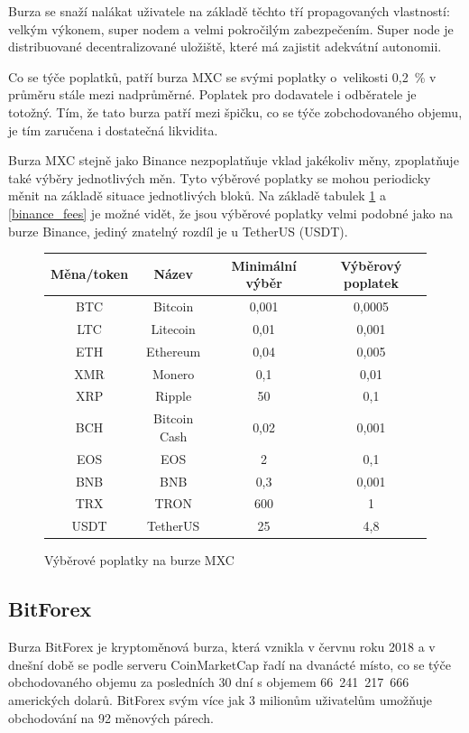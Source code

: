 \documentclass[thesis=B,czech]{FITthesis}[2019/03/21]
\begin{document}
Burza se snaží nalákat uživatele na základě těchto tří propagovaných vlastností: velkým výkonem, super nodem a velmi pokročilým zabezpečením. Super node je distribuované decentralizované uložiště, které má zajistit adekvátní autonomii.

Co se týče poplatků, patří burza MXC se svými poplatky o~velikosti 0,2~\% v průměru stále mezi nadprůměrné. Poplatek pro dodavatele i odběratele je totožný. Tím, že tato burza patří mezi špičku, co se týče zobchodovaného objemu, je tím zaručena i dostatečná likvidita. \cite{cryptowisser_mxc} 

Burza MXC stejně jako Binance nezpoplatňuje vklad jakékoliv měny, zpoplatňuje také výběry jednotlivých měn. Tyto výběrové poplatky se mohou periodicky měnit na základě situace jednotlivých bloků. \cite{mxc_fees} Na základě tabulek \ref{mxc_fees} a \ref{binance_fees} je možné vidět, že jsou výběrové poplatky velmi podobné jako na burze Binance, jediný znatelný rozdíl je u TetherUS (USDT). \cite{cryptowisser_mxc}

\begin{figure}\centering
    \begin{center}
     \begin{tabular}{||c | c | c | c||} 
     \hline
     Měna/token & Název & Minimální výběr & Výběrový poplatek \\ [0.5ex] 
     \hline\hline
     BTC & Bitcoin & 0,001 & 0,0005 \\ 
     \hline
     LTC & Litecoin & 0,01 & 0,001 \\
     \hline
     ETH & Ethereum & 0,04 & 0,005 \\
     \hline
     XMR & Monero & 0,1 & 0,01 \\
     \hline
     XRP & Ripple & 50 & 0,1 \\
     \hline
     BCH & Bitcoin Cash & 0,02 & 0,001 \\
     \hline
     EOS & EOS & 2 & 0,1 \\
     \hline
     BNB & BNB & 0,3 & 0,001 \\
     \hline
     TRX & TRON & 600 & 1 \\
     \hline
     USDT & TetherUS & 25 & 4,8 \\ [1ex] 
     \hline
    \end{tabular}
    \end{center}
    \caption{Výběrové poplatky na burze MXC \cite{mxc_fees}}
    \label{mxc_fees}
\end{figure}
\subsection{BitForex}
Burza BitForex je kryptoměnová burza, která vznikla v červnu roku 2018 a v dnešní době se podle serveru CoinMarketCap řadí na dvanácté místo, co se týče obchodovaného objemu za posledních 30 dní s objemem 66~241~217~666 amerických dolarů. \cite{coinmarketcap} BitForex svým více jak 3 milionům uživatelům umožňuje obchodování na 92 měnových párech.  \cite{cryptowisser_bitforex}
\end{document}
